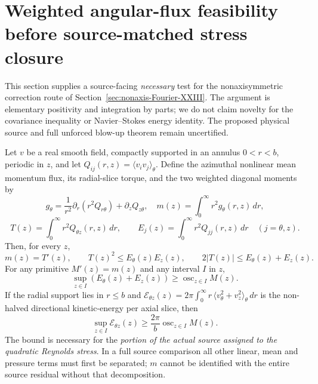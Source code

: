 
\section{Weighted angular-flux feasibility before source-matched stress closure}
\label{sec:weighted-flux-XXIV}
This section supplies a source-facing \emph{necessary} test for the
nonaxisymmetric correction route of Section~\ref{sec:nonaxis-Fourier-XXIII}.
The argument is elementary positivity and integration by parts; we do
not claim novelty for the covariance inequality or Navier--Stokes
energy identity. The proposed physical source and full unforced
blow-up theorem remain uncertified.

\begin{theorem}
\label{thm:weighted-flux-XXIV}
Let $v$ be a real smooth field, compactly supported in an annulus
$0<r<b$, periodic in $z$, and let
$Q_{ij}(r,z)=\langle v_i v_j\rangle_\theta$.
Define the azimuthal nonlinear mean momentum flux, its radial-slice
torque, and the two weighted diagonal moments by
\[
g_\theta=\frac1{r^2}\partial_r(r^2Q_{r\theta})
               +\partial_zQ_{z\theta},\quad
m(z)=\int_0^\infty r^2g_\theta(r,z)\,dr,
\]
\[
T(z)=\int_0^\infty r^2Q_{\theta z}(r,z)\,dr,\qquad
E_j(z)=\int_0^\infty r^2Q_{jj}(r,z)\,dr
\quad(j=\theta,z).
\]
Then, for every $z$,
\begin{equation}\label{eq:weighted-CS-XXIV}
m(z)=T'(z),\qquad
T(z)^2\le E_\theta(z)E_z(z),\qquad
2|T(z)|\le E_\theta(z)+E_z(z).
\end{equation}
For any primitive $M'(z)=m(z)$ and any interval $I$ in $z$,
\begin{equation}\label{eq:torque-osc-XXIV}
\boxed{\ \sup_{z\in I}(E_\theta(z)+E_z(z))
       \ge\operatorname{osc}_{z\in I}M(z).\ }
\end{equation}
If the radial support lies in $r\le b$ and
$\mathcal E_{\theta z}(z)=2\pi\int_0^\infty
r\,\langle v_\theta^2+v_z^2\rangle_\theta\,dr$ is the
non-halved directional kinetic-energy per axial slice, then
\begin{equation}\label{eq:physical-energy-XXIV}
\boxed{\ \sup_{z\in I}\mathcal E_{\theta z}(z)
 \ge \frac{2\pi}{b}\operatorname{osc}_{z\in I}M(z).\ }
\end{equation}
The bound is necessary for the \emph{portion of the actual source
assigned to the quadratic Reynolds stress}. In a full source
comparison all other linear, mean and pressure terms must first be
separated; $m$ cannot be identified with the entire source residual
without that decomposition.
\end{theorem}
